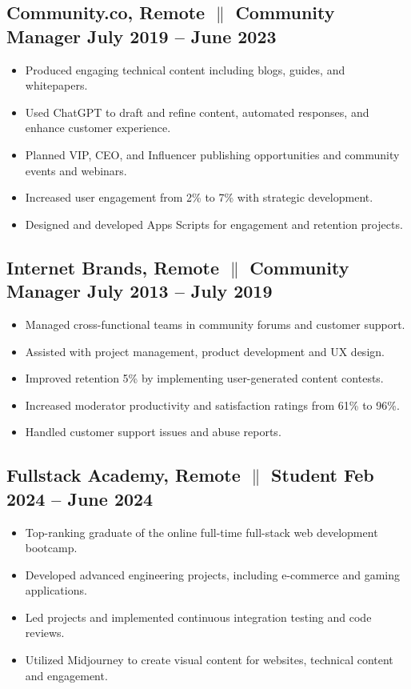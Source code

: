\documentclass[a4paper,9pt]{article}
\begin{document}
\subsection{Community.co, Remote {$\parallel$}{ Community Manager} \hfill
      \textbf{July 2019 – June
            2023}}
\begin{itemize}
      \item Produced engaging technical content including blogs, guides, and whitepapers.
      \item Used ChatGPT to draft and refine content, automated responses, and enhance customer experience.
      \item Planned VIP, CEO, and Influencer publishing opportunities and community
            events and webinars.
      \item Increased user engagement from 2\% to 7\% with
            strategic
            development.
      \item Designed and developed Apps Scripts for engagement and retention
            projects.
\end{itemize}

\subsection{Internet Brands, Remote {$\parallel$}{ Community Manager} \hfill
      \textbf{July 2013 – July
            2019}}
\begin{itemize}
      \item Managed cross-functional teams in community forums and customer
            support.
      \item Assisted with project management, product development and UX design.
      \item Improved retention 5\% by implementing user-generated content contests.
      \item Increased moderator productivity and satisfaction ratings from 61\%
            to
            96\%.
      \item Handled customer support issues and abuse reports.
\end{itemize}

\subsection{Fullstack Academy, Remote {$\parallel$}{ Student} \hfill
      \textbf{Feb
            2024 – June
            2024}}
\begin{itemize}
      \item Top-ranking graduate of the online full-time full-stack web
            development
            bootcamp.
      \item Developed advanced engineering projects, including e-commerce and gaming applications.
      \item Led projects and implemented continuous integration testing and code reviews.
      \item Utilized Midjourney to create visual content for websites, technical content and engagement.
\end{itemize}
\end{document}
